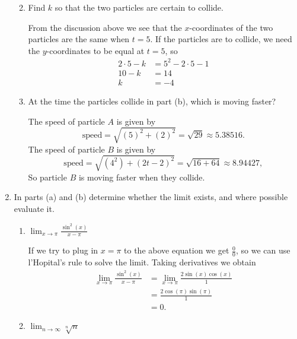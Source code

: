 \documentclass[11pt]{article}
\begin{document}
\begin{enumerate}
\begin{enumerate}
    \vfill
    
  \item Find $k$ so that the two particles are certain to collide.

    \vfill

    From the discussion above we see that the $x$-coordinates of the
    two particles are the same when $t=5$.  If the particles are to
    collide, we need the $y$-coordinates to be equal at $t=5$, so
    \begin{align*}
      2\cdot 5 -k &= 5^2-2\cdot 5 -1\\
      10-k &= 14\\
      k &= -4
    \end{align*}

    \vfill
    
  \item At the time the particles collide in part (b), which is moving
    faster?

    \vfill

    The speed of particle $A$ is given by
    \[
    \text{speed} = \sqrt{(5)^2+(2)^2}=\sqrt{29}\approx 5.38516.
    \]
    The speed of particle $B$ is given by
    \[
    \text{speed} = \sqrt{(4^2)+(2t-2)^2} = \sqrt{16+64} \approx 8.94427,
    \]
    So particle $B$ is moving faster when they collide.

    \vfill
  \end{enumerate}
  \newpage

\item In parts (a) and (b) determine whether the limit exists, and
  where possible evaluate it.
  \begin{enumerate}
  \item $\displaystyle\lim_{x\to \pi}\frac{\sin^2(x)}{x-\pi}$

    \vfill

    If we try to plug in $x=\pi$ to the above equation we get
    $\frac{0}{0}$, so we can use l'Hopital's rule to solve the limit.
    Taking derivatives we obtain
    \begin{align*}
      \displaystyle\lim_{x\to \pi}\frac{\sin^2(x)}{x-\pi} &= \displaystyle\lim_{x\to \pi}\frac{2\sin(x)\cos(x)}{1}\\
      &= \frac{2\cos(\pi)\sin(\pi)}{1}\\
      &= 0.
    \end{align*}

    \vfill
    
  \item $\displaystyle\lim_{n\to \infty}\sqrt[n]{n}$


\end{enumerate}
\end{enumerate}
\end{document}

